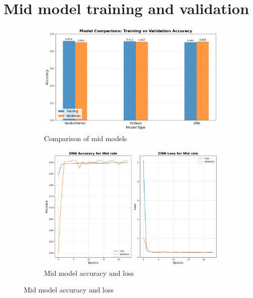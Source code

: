 \documentclass[12pt, a4paper]{article}
\begin{document}
\section{Mid model training and validation}\label{sec:mid_model_training}
\begin{figure}[!ht]
    \centering
    \begin{subfigure}[b]{0.8\textwidth}
        \centering
        \includegraphics[width=\textwidth]{figures/2_mid_model_comparison.png}
        \caption{Comparison of mid models}
    \end{subfigure}
    \begin{subfigure}[b]{0.8\textwidth}
        \centering
        \includegraphics[width=\textwidth]{figures/2_mid_model_acc_loss.png}
        \caption{Mid model accuracy and loss}
    \end{subfigure}
\end{figure}

\clearpage
\end{document}
